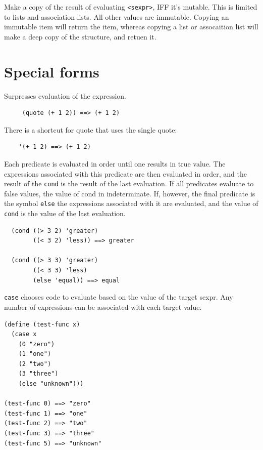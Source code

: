 \documentclass[12pt]{article}
\begin{document}
Make a copy of the result of evaluating \verb|<sexpr>|, IFF it's
mutable. This is limited to lists and association lists. All other
values are immutable. Copying an immutable item will return the item,
whereas copying a list or assocaition list will make a deep copy of
the structure, and retuen it.

\section{Special forms}


Surpresses evaluation of the expression.

\begin{verbatim}
     (quote (+ 1 2)) ==> (+ 1 2)
\end{verbatim}

There is a shortcut for quote that uses the single quote:

\begin{verbatim}
    '(+ 1 2) ==> (+ 1 2)
\end{verbatim}


Each predicate is evaluated in order until one results in true value.
The expressions associated with this predicate are then evaluated in order,
and the result of the \verb|cond| is the result of the last
evaluation. If all predicates evaluate to false values, the value of
cond in indeterminate. If, however, the final predicate is the symbol
\verb|else| the expressions associated with it are evaluated, and the
value of \verb|cond| is the value of the last evaluation.

\begin{verbatim}
  (cond ((> 3 2) 'greater)
        ((< 3 2) 'less)) ==> greater

  (cond ((> 3 3) 'greater)
        ((< 3 3) 'less)
        (else 'equal)) ==> equal
\end{verbatim}


\verb|case| chooses code to evaluate based on the value of the target
sexpr. Any number of expressions can be associated with each target value.

\begin{verbatim}
(define (test-func x)
  (case x
    (0 "zero")
    (1 "one")
    (2 "two")
    (3 "three")
    (else "unknown")))

(test-func 0) ==> "zero"
(test-func 1) ==> "one"
(test-func 2) ==> "two"
(test-func 3) ==> "three"
(test-func 5) ==> "unknown"
\end{verbatim}
\end{document}
